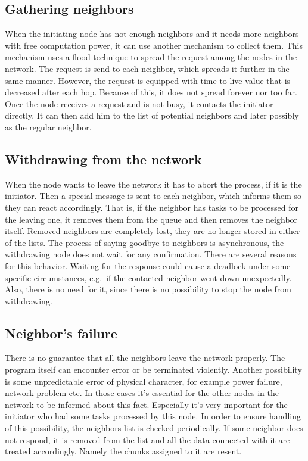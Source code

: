 \subsection*{Gathering neighbors}

When the initiating node has not enough neighbors and it needs more
neighbors with free computation power, it can use another mechanism to
collect them. This mechanism uses a flood technique to spread the
request among the nodes in the network. The request is send to each
neighbor, which spreads it further in the same manner. However, the
request is equipped with time to live value that is decreased after each
hop. Because of this, it does not spread forever nor too far. Once the
node receives a request and is not busy, it contacts the initiator
directly. It can then add him to the list of potential neighbors and
later possibly as the regular neighbor.

\subsection*{Withdrawing from the network}

When the node wants to leave the network it has to abort the process, if
it is the initiator. Then a special message is sent to each neighbor,
which informs them so they can react accordingly. That is, if the
neighbor has tasks to be processed for the leaving one, it removes them
from the queue and then removes the neighbor itself. Removed neighbors
are completely lost, they are no longer stored in either of the lists.
The process of saying goodbye to neighbors is asynchronous, the
withdrawing node does not wait for any confirmation. There are several
reasons for this behavior. Waiting for the response could cause a
deadlock under some specific circumstances, e.g.~if the contacted
neighbor went down unexpectedly. Also, there is no need for it, since
there is no possibility to stop the node from withdrawing.

\subsection*{Neighbor's failure}

There is no guarantee that all the neighbors leave the network properly.
The program itself can encounter error or be terminated violently.
Another possibility is some unpredictable error of physical character,
for example power failure, network problem etc. In those cases it's
essential for the other nodes in the network to be informed about this
fact. Especially it's very important for the initiator who had some
tasks processed by this node. In order to ensure handling of this
possibility, the neighbors list is checked periodically. If some
neighbor does not respond, it is removed from the list and all the data
connected with it are treated accordingly. Namely the chunks assigned to
it are resent.

